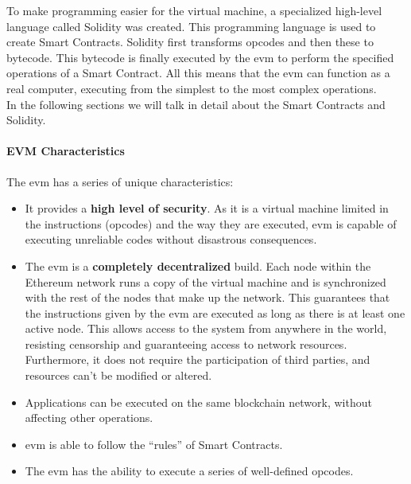 \documentclass[a4paper, 12pt]{article} %
\begin{document}
                To make programming easier for the virtual machine, a specialized high-level language called Solidity was created. This programming language is used to create Smart Contracts. Solidity first transforms opcodes and then these to bytecode. This bytecode is finally executed by the \acrshort{evm} to perform the specified operations of a  Smart Contract. All this means that the \acrshort{evm} can function as a real computer, executing from the simplest to the most complex operations.\\
                
                In the following sections we will talk in detail about the Smart Contracts and Solidity.
                
            \paragraph{EVM Characteristics}
                The \acrshort{evm} has a series of unique characteristics\cite{ethereumGavin}\cite{ethereumDocu}:
                \begin{itemize}
                    \item It provides a \textbf{high level of security}. As it is a virtual machine limited in the instructions (opcodes) and the way they are executed, \acrshort{evm} is capable of executing unreliable codes without disastrous consequences.
                    \item The \acrshort{evm} is a \textbf{completely decentralized} build. Each node within the Ethereum network runs a copy of the virtual machine and is synchronized with the rest of the nodes that make up the network. This guarantees that the instructions given by the \acrshort{evm} are executed as long as there is at least one active node. This allows access to the system from anywhere in the world, resisting censorship and guaranteeing access to network resources. Furthermore, it does not require the participation of third parties, and resources can’t be modified or altered.
                    \item Applications can be executed on the same blockchain network, without affecting other operations.
                    \item \acrshort{evm} is able to follow the “rules” of Smart Contracts.
                    \item The \acrshort{evm} has the ability to execute a series of well-defined opcodes.
                \end{itemize}
                
\end{document}
